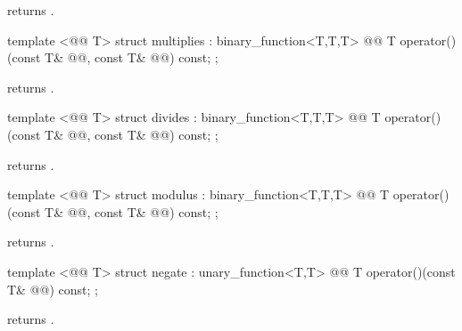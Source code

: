 \documentclass[american,twoside]{book}
\begin{document}
\begin{itemdescr}
\pnum
{}
returns
.
\end{itemdescr}

%
\begin{itemdecl}
template <@@ T> struct multiplies : binary_function<T,T,T> {
  @@
    T operator()(const T& @@, const T& @@) const;
};
\end{itemdecl}

\begin{itemdescr}
\pnum
{}
returns
.
\end{itemdescr}

%
\begin{itemdecl}
template <@@ T> struct divides : binary_function<T,T,T> {
  @@
  T operator()(const T& @@, const T& @@) const;
};
\end{itemdecl}

\begin{itemdescr}
\pnum
{}
returns
.
\end{itemdescr}

%
\begin{itemdecl}
template <@@ T> struct modulus : binary_function<T,T,T> {
  @@
    T operator()(const T& @@, const T& @@) const;
};
\end{itemdecl}

\begin{itemdescr}
\pnum
{} returns .
\end{itemdescr}

%
\begin{itemdecl}
template <@@ T> struct negate : unary_function<T,T> {
  @@
    T operator()(const T& @@) const;
};
\end{itemdecl}

\begin{itemdescr}
\pnum
{} returns .
\end{itemdescr}
\end{document}
